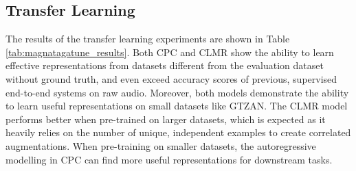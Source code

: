 \subsection{Transfer Learning}
The results of the transfer learning experiments are shown in Table \ref{tab:magnatagatune_results}. Both CPC and CLMR show the ability to learn effective representations from datasets different from the evaluation dataset without ground truth, and even exceed accuracy scores of previous, supervised end-to-end systems on raw audio\cite{dieleman2014end}. Moreover, both models demonstrate the ability to learn useful representations on small datasets like GTZAN. The CLMR model performs better when pre-trained on larger datasets, which is expected as it heavily relies on the number of unique, independent examples to create correlated augmentations. When pre-training on smaller datasets, the autoregressive modelling in CPC can find more useful representations for downstream tasks.

\begin{table}[t]
    \centering
    \caption{Performance of the self-supervised models when pre-trained on datasets different from the evaluation dataset, again using a linear classifier to evaluate.}
    \label{tab:magnatagatune_results}
\end{table}



